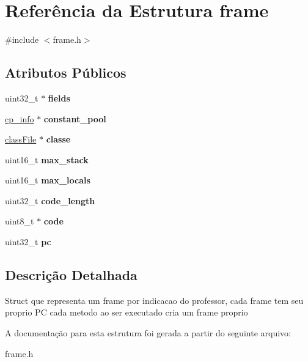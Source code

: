 \hypertarget{structframe}{\section{Referência da Estrutura frame}
\label{structframe}
}


{\ttfamily \#include $<$frame.\-h$>$}

\subsection*{Atributos Públicos}
\begin{DoxyCompactItemize}
\item 
\hypertarget{structframe_a96e5a755ca29b9d32e1367a3e063b30c}{uint32\-\_\-t $\ast$ {\bfseries fields}}\label{structframe_a96e5a755ca29b9d32e1367a3e063b30c}

\item 
\hypertarget{structframe_a235ada376a4af8a566332ad046c92f83}{\hyperlink{structcp__info}{cp\-\_\-info} $\ast$ {\bfseries constant\-\_\-pool}}\label{structframe_a235ada376a4af8a566332ad046c92f83}

\item 
\hypertarget{structframe_aee64828d070d3ae688dd8e09948e989c}{\hyperlink{structClassFile}{class\-File} $\ast$ {\bfseries classe}}\label{structframe_aee64828d070d3ae688dd8e09948e989c}

\item 
\hypertarget{structframe_a21004a70deb96c08f1dd6fd30f610b51}{uint16\-\_\-t {\bfseries max\-\_\-stack}}\label{structframe_a21004a70deb96c08f1dd6fd30f610b51}

\item 
\hypertarget{structframe_afff6c0343d82c67273a7c92f582f7ba8}{uint16\-\_\-t {\bfseries max\-\_\-locals}}\label{structframe_afff6c0343d82c67273a7c92f582f7ba8}

\item 
\hypertarget{structframe_a2a43626ab33a7b6ed584eb7a47fc93e8}{uint32\-\_\-t {\bfseries code\-\_\-length}}\label{structframe_a2a43626ab33a7b6ed584eb7a47fc93e8}

\item 
\hypertarget{structframe_a248713b5b9384b4d3edd365ee82625b4}{uint8\-\_\-t $\ast$ {\bfseries code}}\label{structframe_a248713b5b9384b4d3edd365ee82625b4}

\item 
\hypertarget{structframe_a5915ace0f09c12110a4571ac827baf44}{uint32\-\_\-t {\bfseries pc}}\label{structframe_a5915ace0f09c12110a4571ac827baf44}

\end{DoxyCompactItemize}


\subsection{Descrição Detalhada}
Struct que representa um frame por indicacao do professor, cada frame tem seu proprio P\-C cada metodo ao ser executado cria um frame proprio 

A documentação para esta estrutura foi gerada a partir do seguinte arquivo\-:\begin{DoxyCompactItemize}
\item 
frame.\-h\end{DoxyCompactItemize}

